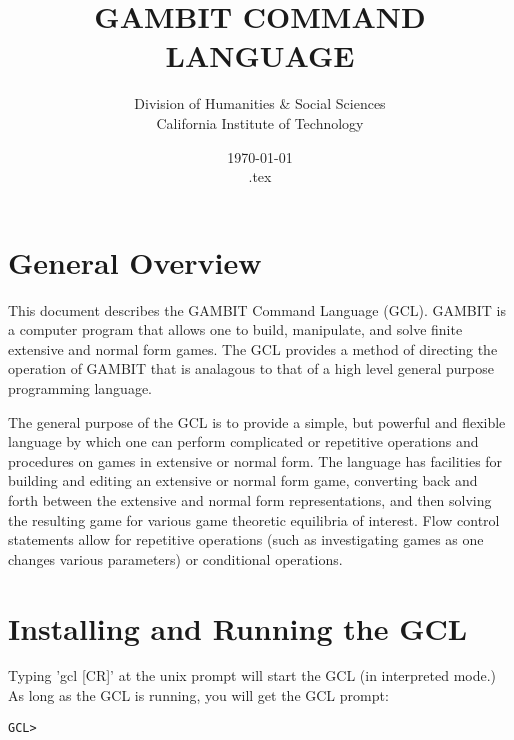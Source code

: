 %
%
%
\renewcommand{\baselinestretch}{.9}
\newcommand{\bd}{\begin{description}}
\newcommand{\ed}{\end{description}}


\title{GAMBIT COMMAND LANGUAGE}

\author{Division of Humanities \& Social Sciences\\
California Institute of Technology}

\date{\today\\ \jobname.tex}

\maketitle

\tableofcontents

\section{General Overview}

This document describes the GAMBIT Command Language (GCL).  GAMBIT is
a computer program that allows one to build, manipulate, and solve
finite extensive and normal form games. The GCL provides a method of
directing the operation of GAMBIT that is analagous to that of a high
level general purpose programming language.

The general purpose of the GCL is to provide a simple, but powerful
and flexible language by which one can perform complicated or
repetitive operations and procedures on games in extensive or normal
form.  The language has facilities for building and editing an
extensive or normal form game, converting back and forth between the
extensive and normal form representations, and then solving the
resulting game for various game theoretic equilibria of interest. Flow
control statements allow for repetitive operations (such as
investigating games as one changes various parameters) or conditional
operations.


\section{Installing and Running the GCL}
Typing 'gcl [CR]' at the unix prompt will start the GCL (in
interpreted mode.)  As long as the GCL is running, you will get the
GCL prompt:
\begin{verbatim}
GCL>
\end{verbatim}

